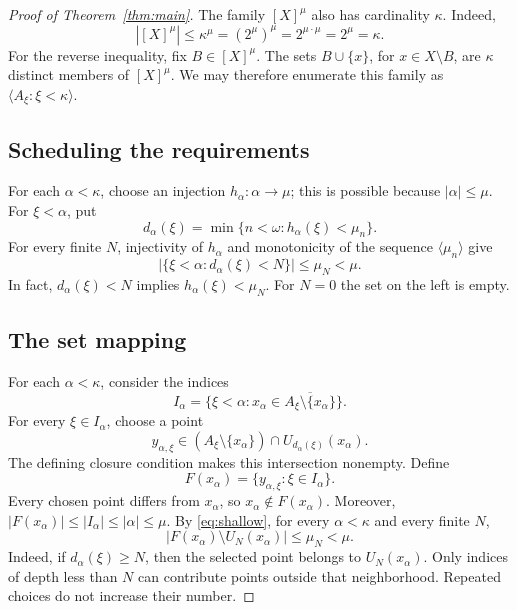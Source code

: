 \documentclass[10pt,leqno]{amsart}
\numberwithin{equation}{section}
\begin{document}
\begin{proof}[Proof of Theorem~\ref{thm:main}]
The family $[X]^\mu$ also has cardinality $\kappa$. Indeed,
\begin{equation}\label{eq:cardFamily}
 |[X]^\mu|\leq\kappa^\mu=(2^\mu)^\mu
             =2^{\mu\cdot\mu}=2^\mu=\kappa.
\end{equation}
For the reverse inequality, fix $B\in[X]^\mu$. The sets $B\cup\{x\}$, for
$x\in X\setminus B$, are $\kappa$ distinct members of $[X]^\mu$. We may
therefore enumerate this family as $\langle A_\xi:\xi<\kappa\rangle$.

\subsection{Scheduling the requirements}
For each $\alpha<\kappa$, choose an injection $h_\alpha:\alpha\to\mu$;
this is possible because $|\alpha|\leq\mu$. For $\xi<\alpha$, put
\begin{equation}\label{eq:depth}
 d_\alpha(\xi)=\min\{n<\omega:h_\alpha(\xi)<\mu_n\}.
\end{equation}
For every finite $N$, injectivity of $h_\alpha$ and monotonicity of the
sequence $\langle\mu_n\rangle$ give
\begin{equation}\label{eq:shallow}
 |\{\xi<\alpha:d_\alpha(\xi)<N\}|\leq\mu_N<\mu.
\end{equation}
In fact, $d_\alpha(\xi)<N$ implies $h_\alpha(\xi)<\mu_N$. For $N=0$ the
set on the left is empty.

\subsection{The set mapping}
For each $\alpha<\kappa$, consider the indices
\[
 I_\alpha=\{\xi<\alpha:x_\alpha\in
             \overline{A_\xi\setminus\{x_\alpha\}}\}.
\]
For every $\xi\in I_\alpha$, choose a point
\[
 y_{\alpha,\xi}\in(A_\xi\setminus\{x_\alpha\})
                    \cap U_{d_\alpha(\xi)}(x_\alpha).
\]
The defining closure condition makes this intersection nonempty. Define
\begin{equation}\label{eq:mapping}
 F(x_\alpha)=\{y_{\alpha,\xi}:\xi\in I_\alpha\}.
\end{equation}
Every chosen point differs from $x_\alpha$, so $x_\alpha\notin F(x_\alpha)$.
Moreover,
$|F(x_\alpha)|\leq|I_\alpha|\leq|\alpha|\leq\mu$.
By \eqref{eq:shallow}, for every $\alpha<\kappa$ and every finite $N$,
\begin{equation}\label{eq:exceptions}
 |F(x_\alpha)\setminus U_N(x_\alpha)|\leq\mu_N<\mu.
\end{equation}
Indeed, if $d_\alpha(\xi)\geq N$, then the selected point belongs to
$U_N(x_\alpha)$. Only indices of depth less than $N$ can contribute points
outside that neighborhood. Repeated choices do not increase their number.


\end{proof}
\end{document}
